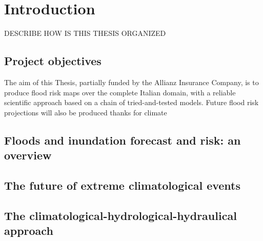 \chapter{Introduction}
DESCRIBE HOW IS THIS THESIS ORGANIZED

\section{Project objectives}
The aim of this Thesis, partially funded by the Allianz Insurance Company, is to produce flood risk maps over the complete Italian domain, with a reliable scientific approach based on a chain of tried-and-tested models. Future flood risk projections will also be produced thanks for climate 

\section{Floods and inundation forecast and risk: an overview}

\section{The future of extreme climatological events}

\section{The climatological-hydrological-hydraulical approach}
